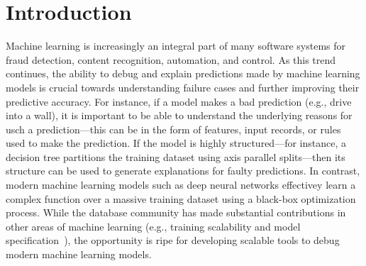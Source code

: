 \section{Introduction}\label{intro}
Machine learning is increasingly an integral part of many software systems for fraud detection, content recognition, automation, and control.
As this trend continues, the ability to debug and explain predictions made by machine learning models is crucial towards understanding failure cases and further improving their predictive accuracy.
For instance, if a model makes a bad prediction (e.g., drive into a wall), it is important to be able to understand the underlying reasons for usch a prediction---this can be in the form of features, input records, or rules used to make the prediction.
If the model is highly structured---for instance, a decision tree partitions the training dataset using axis parallel splits---then its structure can be used to generate explanations for faulty predictions.
In contrast, modern machine learning models such as deep neural networks effectivey learn a complex function over a massive training dataset using a black-box optimization process.
While the database community has made substantial contributions in other areas of machine learning (e.g., training scalability and model specification~\cite{hellerstein2012madlib,tensor,kraska2013mlbase,crotty2014tupleware,keystone}), the opportunity is ripe for developing scalable tools to debug modern machine learning models.



